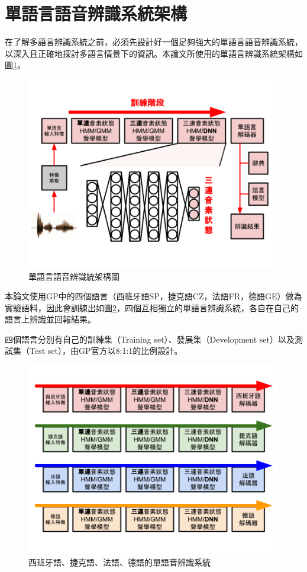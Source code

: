 \section{單語言語音辨識系統架構}
在了解多語言辨識系統之前，必須先設計好一個足夠強大的單語言語音辨識系統，以深入且正確地探討多語言情景下的資訊。本論文所使用的單語言辨識系統架構如圖\ref{fig:chap3_framework}。
\begin{figure}[!h]
\centering
\includegraphics[scale=0.4]{images/chap3_framework.png}
\caption{單語言語音辨識統架構圖}
\label{fig:chap3_framework}
\end{figure}

本論文使用GP中的四個語言（西班牙語SP，捷克語CZ，法語FR，德語GE）做為實驗語料，因此會訓練出如圖\ref{fig:chap3_monolingual}，四個互相獨立的單語言辨識系統，各自在自己的語言上辨識並回報結果。

四個語言分別有自己的訓練集（Training set）、發展集（Development set）以及測試集（Test set），由GP官方以8:1:1的比例設計。

\begin{figure}[!h]
\centering
\includegraphics[scale=0.4]{images/chap3_monolingual.png}
\caption{西班牙語、捷克語、法語、德語的單語音辨識系統}
\label{fig:chap3_monolingual}
\end{figure}
